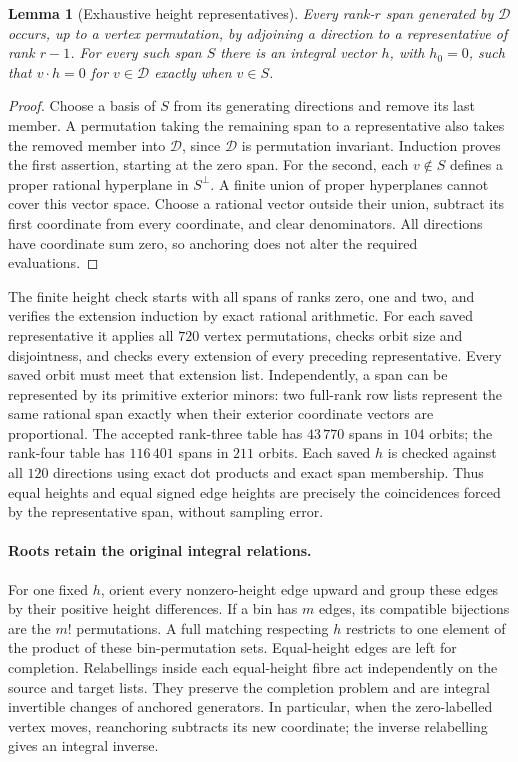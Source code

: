 \documentclass[11pt]{article}
\newtheorem{lemma}[theorem]{Lemma}
\theoremstyle{remark}
\begin{document}
\begin{lemma}[Exhaustive height representatives]
Every rank-$r$ span generated by $\mathcal D$ occurs, up to a vertex
permutation, by adjoining a direction to a representative of rank $r-1$.
For every such span $S$ there is an integral vector $h$, with $h_0=0$,
such that $v\cdot h=0$ for $v\in\mathcal D$ exactly when $v\in S$.
\end{lemma}
\begin{proof}
Choose a basis of $S$ from its generating directions and remove its last
member. A permutation taking the remaining span to a representative
also takes the removed member into $\mathcal D$, since $\mathcal D$ is
permutation invariant. Induction proves the first assertion, starting
at the zero span. For the second, each $v\notin S$ defines a proper
rational hyperplane in $S^\perp$. A finite union of proper hyperplanes
cannot cover this vector space. Choose a rational vector outside their
union, subtract its first coordinate from every coordinate, and clear
denominators. All directions have coordinate sum zero, so anchoring
does not alter the required evaluations.
\end{proof}

The finite height check starts with all spans of ranks zero, one and
two, and verifies the extension induction by exact rational arithmetic.
For each saved representative it applies all $720$ vertex permutations,
checks orbit size and disjointness, and checks every extension of every
preceding representative. Every saved orbit must meet that extension
list. Independently, a span can be represented by its primitive exterior
minors: two full-rank row lists represent the same rational span exactly
when their exterior coordinate vectors are proportional. The accepted
rank-three table has $43\,770$ spans in $104$ orbits; the rank-four table
has $116\,401$ spans in $211$ orbits. Each saved $h$ is checked against
all $120$ directions using exact dot products and exact span membership.
Thus equal heights and equal signed edge heights are precisely the
coincidences forced by the representative span, without sampling error.

\paragraph{Roots retain the original integral relations.}
For one fixed $h$, orient every nonzero-height edge upward and group
these edges by their positive height differences. If a bin has $m$
edges, its compatible bijections are the $m!$ permutations. A full
matching respecting $h$ restricts to one element of the product of
these bin-permutation sets. Equal-height edges are left for completion.
Relabellings inside each equal-height fibre act independently on the
source and target lists. They preserve the completion problem and
are integral invertible changes of anchored generators. In particular,
when the zero-labelled vertex moves, reanchoring subtracts its new
coordinate; the inverse relabelling gives an integral inverse.
\end{document}
